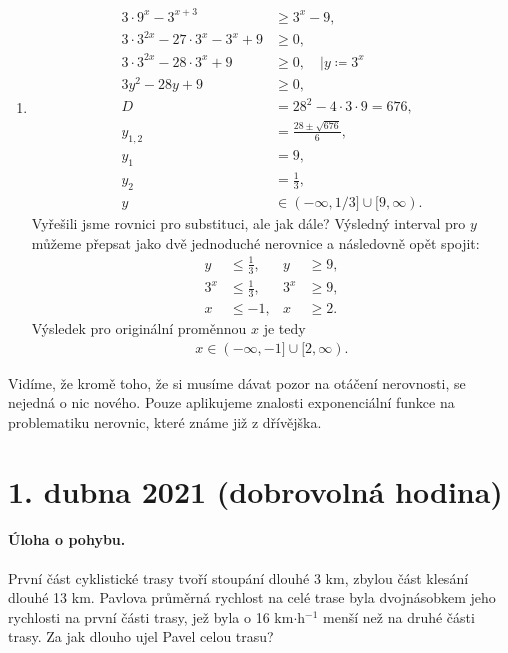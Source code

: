 \documentclass[11pt,a4paper]{article}
\begin{document}
\begin{enumerate}
            \item \begin{align*}
                3\cdot 9^x - 3^{x+3} &\geq 3^x - 9,
            \\
                3\cdot 3^{2x} - 27\cdot 3^x - 3^x + 9 &\geq 0,
            \\
                3\cdot 3^{2x} - 28\cdot 3^x + 9 &\geq 0, \quad \Big| y \coloneqq 3^x
            \\
                3y^2 - 28y + 9 &\geq 0,
            \\
                D &= 28^2 - 4\cdot3\cdot9 = 676,
            \\
                y_{1,2} &= \frac{28 \pm \sqrt{676}}{6},
            \\
                y_1 &= 9,
            \\
                y_2 &= \frac 13,
            \\
                y &\in (-\infty,1/3] \cup [9,\infty).
            \end{align*}
            Vyřešili jsme rovnici pro substituci, ale jak dále? Výsledný interval pro $y$ můžeme přepsat jako dvě jednoduché nerovnice a následovně opět spojit:
            \begin{align*}
                y &\leq \frac 13,
            &
                y &\geq 9,
            \\
                3^x &\leq \frac 13,
            &
                3^x &\geq 9,
            \\
                x &\leq -1,
            &
                x &\geq 2.
            \end{align*}
            Výsledek pro originální proměnnou $x$ je tedy
            \begin{align*}
                x \in (-\infty,-1]\cup[2,\infty).
            \end{align*}

        \end{enumerate}
        
        Vidíme, že kromě toho, že si musíme dávat pozor na otáčení nerovnosti, se nejedná o nic nového. Pouze aplikujeme znalosti exponenciální funkce na problematiku nerovnic, které známe již z dřívějška.

    \section*{1. dubna 2021 (dobrovolná hodina)}

        \paragraph*{Úloha o pohybu.} První část cyklistické trasy tvoří stoupání dlouhé 3 km, zbylou část klesání dlouhé 13 km. Pavlova průměrná rychlost na celé trase byla dvojnásobkem jeho rychlosti na první části trasy, jež byla o 16 km$\cdot$h$^{-1}$ menší než na druhé části trasy. Za jak dlouho ujel Pavel celou trasu?
\end{document}
